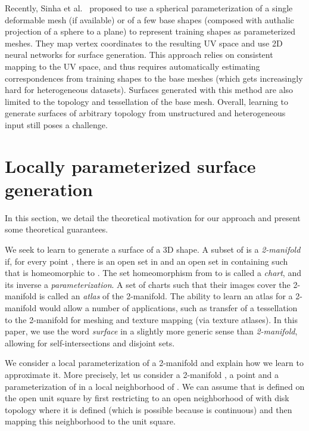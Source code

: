 \documentclass[10pt,twocolumn,letterpaper]{article}
\begin{document}
Recently, Sinha et al.~\cite{Sinha2017} proposed to use a spherical parameterization of a single deformable mesh (if available) or of a few base shapes (composed with authalic projection of a sphere to a plane) to represent training shapes as parameterized meshes. They map vertex coordinates to the resulting UV space and use 2D neural networks for surface generation. This approach relies on consistent mapping to the UV space, and thus requires automatically estimating correspondences from training shapes to the base meshes (which gets increasingly hard for heterogeneous datasets). Surfaces generated with this method are also limited to the topology and tessellation of the base mesh. Overall, learning to generate surfaces of arbitrary topology from unstructured and heterogeneous input still poses a challenge.














 
\section{Locally parameterized surface generation}

In this section, we detail the theoretical motivation for our approach and present some theoretical guarantees.


\label{sec:theory}
We seek to learn to generate a surface of a 3D shape. 
A subset  of  is a \textit{2-manifold} if, for every point , there is an open set  in  and an open set  in  containing  such that  is homeomorphic to . 
The set homeomorphism from  to  is called a {\it chart}, and its inverse a {\it parameterization}.
A set of charts such that their images cover the 2-manifold is called an {\it atlas} of the 2-manifold. 
The ability to learn an atlas for a 2-manifold would allow a number of applications, such as transfer of a  tessellation to the 2-manifold for meshing and texture mapping (via texture atlases). In this paper, we use the word \textit{surface} in a slightly more generic sense than \textit{2-manifold}, allowing for self-intersections and disjoint sets.

We consider a local parameterization of a 2-manifold and explain how we learn to approximate it. More precisely, let us consider a 2-manifold , a point   and a parameterization  of  in a local neighborhood of . We can assume that  is defined on the open unit square  by first restricting  to an open neighborhood of  with disk topology where it is defined (which is possible because  is continuous) and then mapping this neighborhood to the unit square. 
\end{document}
